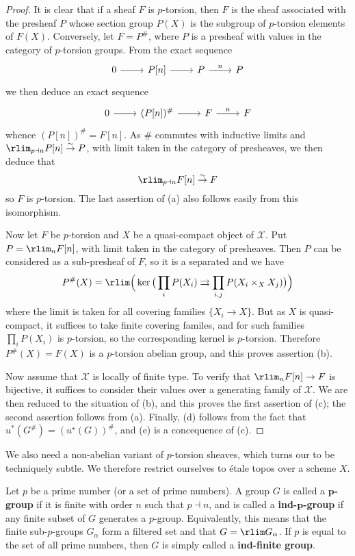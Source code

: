 \begin{proof}
It is clear that if a sheaf $F$ is $p$-torsion, then $F$ is the sheaf associated with the presheaf $P$ whose section group $P(X)$ is the subgroup of $p$-torsion elements of $F(X)$. Conversely, let $F=P^\#$, where $P$ is a presheaf with values in the category of $p$-torsion groups. From the exact sequence
\[\begin{tikzcd}
0\ar[r]&P[n]\ar[r]&P\ar[r,"n"]&P
\end{tikzcd}\]
we then deduce an exact sequence
\[\begin{tikzcd}
0\ar[r]&(P[n])^\#\ar[r]&F\ar[r,"n"]&F
\end{tikzcd}\]
whence $(P[n])^\#=F[n]$. As $\#$ commutes with inductive limits and $\rlim_{p\dashv n}P[n]\stackrel{\sim}{\to}P$, with limit taken in the category of presheaves, we then deduce that
\[\rlim_{p\dashv n}F[n]\stackrel{\sim}{\to} F\]
so $F$ is $p$-torsion. The last assertion of (a) also follows easily from this isomorphism.\par
Now let $F$ be $p$-torsion and $X$ be a quasi-compact object of $\mathcal{X}$. Put $P=\rlim_nF[n]$, with limit taken in the category of presheaves. Then $P$ can be considered as a sub-presheaf of $F$, so it is a separated and we have
\[P^\#(X)=\rlim\Big(\ker\big(\prod_iP(X_i)\rightrightarrows \prod_{i,j}P(X_i\times_XX_j)\big)\Big)\]
where the limit is taken for all covering families $\{X_i\to X\}$. But as $X$ is quasi-compact, it suffices to take finite covering familes, and for such families $\prod_iP(X_i)$ is $p$-torsion, so the corresponding kernel is $p$-torsion. Therefore $P^\#(X)=F(X)$ is a $p$-torsion abelian group, and this proves assertion (b).\par
Now assume that $\mathcal{X}$ is locally of finite type. To verify that $\rlim_nF[n]\to F$ is bijective, it suffices to consider their values over a generating family of $\mathcal{X}$. We are then reduced to the situation of (b), and this proves the first assertion of (c); the second assertion follows from (a). Finally, (d) follows from the fact that $u^*(G^\#)=(u^\star(G))^\#$, and (e) is a concequence of (c).
\end{proof}

We also need a non-abelian variant of $p$-torsion sheaves, which turns our to be techniquely subtle. We therefore restrict ourselves to \'etale topos over a scheme $X$.

\begin{definition}
Let $p$ be a prime number (or a set of prime numbers). A group $G$ is called a \textbf{$\bm{p}$-group} if it is finite with order $n$ such that $p\dashv n$, and is called a \textbf{ind-$\bm{p}$-group} if any finite subset of $G$ generates a $p$-group. Equivalently, this means that the finite sub-$p$-groups $G_\alpha$ form a filtered set and that $G=\rlim G_\alpha$. If $p$ is equal to the set of all prime numbers, then $G$ is simply called a \textbf{ind-finite group}.
\end{definition}

